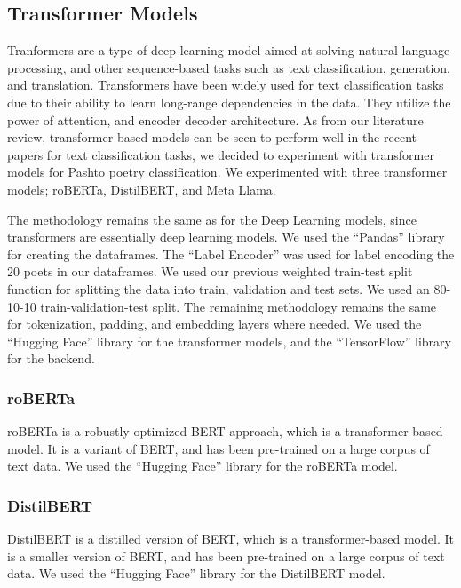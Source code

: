 \subsection{Transformer Models}

Tranformers are a type of deep learning model aimed at solving natural language processing, and other sequence-based tasks such as text classification, generation, and translation. Transformers have been widely used for text classification tasks due to their ability to learn long-range dependencies in the data. They utilize the power of attention, and encoder decoder architecture. As from our literature review, transformer based models can be seen to perform well in the recent papers for text classification tasks, we decided to experiment with transformer models for Pashto poetry classification. We experimented with three transformer models; roBERTa, DistilBERT, and Meta Llama. 

The methodology remains the same as for the Deep Learning models, since transformers are essentially deep learning models. We used the ``Pandas'' library for creating the dataframes. The ``Label Encoder'' was used for label encoding the 20 poets in our dataframes. We used our previous weighted train-test split function for splitting the data into train, validation and test sets. We used an 80-10-10 train-validation-test split. The remaining methodology remains the same for tokenization, padding, and embedding layers where needed. We used the ``Hugging Face'' library for the transformer models, and the ``TensorFlow'' library for the backend. 


\subsubsection{roBERTa}
roBERTa is a robustly optimized BERT approach, which is a transformer-based model. It is a variant of BERT, and has been pre-trained on a large corpus of text data. We used the ``Hugging Face'' library for the roBERTa model.


\subsubsection{DistilBERT}
DistilBERT is a distilled version of BERT, which is a transformer-based model. It is a smaller version of BERT, and has been pre-trained on a large corpus of text data. We used the ``Hugging Face'' library for the DistilBERT model. 


